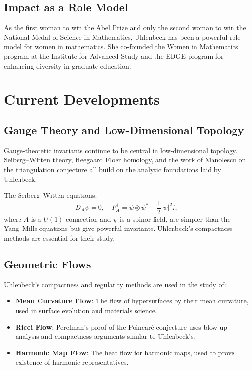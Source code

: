 \subsection{Impact as a Role Model}

As the first woman to win the Abel Prize and only the second woman to win the National Medal of Science in Mathematics, Uhlenbeck has been a powerful role model for women in mathematics. She co-founded the Women in Mathematics program at the Institute for Advanced Study and the EDGE program for enhancing diversity in graduate education.

\section{Current Developments}

\subsection{Gauge Theory and Low-Dimensional Topology}

Gauge-theoretic invariants continue to be central in low-dimensional topology. Seiberg--Witten theory, Heegaard Floer homology, and the work of Manolescu on the triangulation conjecture all build on the analytic foundations laid by Uhlenbeck.

The Seiberg--Witten equations:
\[
D_A \psi = 0, \quad F_A^+ = \psi \otimes \psi^* - \frac{1}{2} |\psi|^2 I,
\]
where $A$ is a $U(1)$ connection and $\psi$ is a spinor field, are simpler than the Yang--Mills equations but give powerful invariants. Uhlenbeck's compactness methods are essential for their study.

\subsection{Geometric Flows}

Uhlenbeck's compactness and regularity methods are used in the study of:
\begin{itemize}
\item \textbf{Mean Curvature Flow}: The flow of hypersurfaces by their mean curvature, used in surface evolution and materials science.
\item \textbf{Ricci Flow}: Perelman's proof of the Poincar\'e conjecture uses blow-up analysis and compactness arguments similar to Uhlenbeck's.
\item \textbf{Harmonic Map Flow}: The heat flow for harmonic maps, used to prove existence of harmonic representatives.
\end{itemize}

